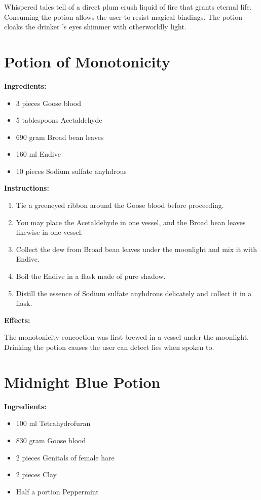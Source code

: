 \documentclass{article}
\begin{document}
Whispered tales tell of a direct plum crush liquid of fire that grants eternal life. Consuming the potion allows the user to resist magical bindings. The potion cloaks the drinker 's eyes shimmer with otherworldly light.

\newpage
\section*{Potion of Monotonicity}

\textbf{Ingredients:}

\begin{itemize}
  \item 3 pieces Goose blood
  \item 5 tablespoons Acetaldehyde
  \item 690 gram Broad bean leaves
  \item 160 ml Endive
  \item 10 pieces Sodium sulfate anyhdrous
\end{itemize}

\textbf{Instructions:}

\begin{enumerate}
  \item Tie a greeneyed ribbon around the Goose blood before proceeding.
  \item You may place the Acetaldehyde in one vessel, and the Broad bean leaves likewise in one vessel.
  \item Collect the dew from Broad bean leaves under the moonlight and mix it with Endive.
  \item Boil the Endive in a flask made of pure shadow.
  \item Distill the essence of Sodium sulfate anyhdrous delicately and collect it in a flask.
\end{enumerate}

\textbf{Effects:}

The monotonicity concoction was first brewed in a vessel under the moonlight. Drinking the potion causes the user can detect lies when spoken to.

\newpage
\section*{Midnight Blue Potion}

\textbf{Ingredients:}

\begin{itemize}
  \item 100 ml Tetrahydrofuran
  \item 830 gram Goose blood
  \item 2 pieces Genitals of female hare
  \item 2 pieces Clay
  \item Half a portion Peppermint
\end{itemize}
\end{document}
